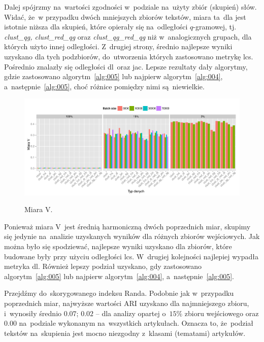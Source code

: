 \documentclass{praca1}
\begin{document}
Dalej spójrzmy na~wartości zgodności w~podziale na~użyty zbiór (skupień) słów. Widać, że~w przypadku dwóch mniejszych zbiorów tekstów, miara ta~dla jest istotnie niższa dla skupień, które opierały się na~odległości $q$-gramowej, tj. \emph{clust\_qg, clust\_red\_qg} oraz \emph{clust\_qg\_red\_qg} niż w~analogicznych grupach, dla których użyto innej odległości. Z~drugiej strony, średnio najlepsze wyniki uzyskano dla tych podzbiorów, do~utworzenia których zastosowano metrykę lcs. Pośrednio znalazły się odległości dl~oraz jac. Lepsze rezultaty dały algorytmy, gdzie zastosowano algorytm~\ref{alg:005} lub najpierw algorytm~\ref{alg:004}, a~następnie~\ref{alg:005}, choć różnice pomiędzy nimi są~niewielkie.

\begin{figure}[!h]
  \centering
  \includegraphics[width=400pt]{plot12.pdf}\\
  \caption{Miara V.}\label{plot:007}
\end{figure}

Ponieważ miara V~jest średnią harmoniczną dwóch poprzednich miar, skupimy się jedynie na~analizie uzyskanych wyników dla różnych zbiorów wejściowych. Jak można było się spodziewać, najlepsze wyniki uzyskano dla zbiorów, które budowane były przy użyciu odległości lcs. W~drugiej kolejności najlepiej wypadła metryka dl. Również lepszy podział uzyskano, gdy zastosowano algorytm~\ref{alg:005} lub najpierw algorytm~\ref{alg:004}, a~następnie~\ref{alg:005}. 

Przejdźmy do~skorygowanego indeksu Randa. Podobnie jak w~przypadku poprzednich miar, najwyższe wartości ARI uzyskano dla najmniejszego zbioru, i~wynosiły średnio $0.07$; $0.02$ -- dla analizy opartej o~$15\%$ zbioru wejściowego oraz $0.00$ na~podziale wykonanym na~wszystkich artykułach. Oznacza to, że~podział tekstów na~skupienia jest mocno niezgodny z~klasami (tematami) artykułów. 
\end{document}
